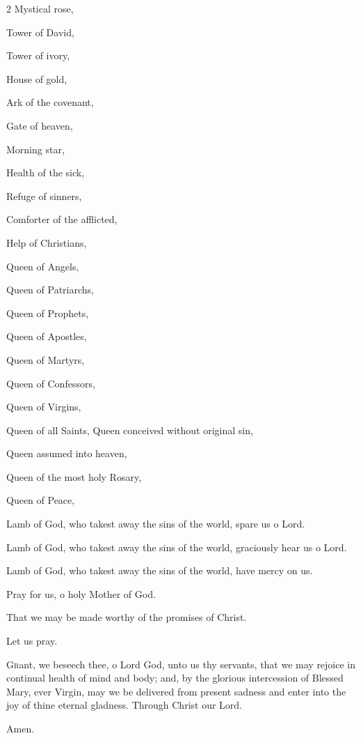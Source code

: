\begin{enpars}
\begin{multicols}{2}
Mystical rose,

Tower of David,

Tower of ivory,

House of gold,

Ark of the covenant,

Gate of heaven,

Morning star,

Health of the sick,

Refuge of sinners,

Comforter of the afflicted,

Help of Christians,

Queen of Angels,

Queen of Patriarchs,

Queen of Prophets,

Queen of Apostles,

Queen of Martyrs,

Queen of Confessors,

Queen of Virgins,

Queen of all Saints,
Queen conceived without original sin,

Queen assumed into heaven,

Queen of the most holy Rosary,

Queen of Peace,

Lamb of God, who takest away
the sins of the world, 
spare us o Lord.

Lamb of God, who takest away
the sins of the world, 
graciously hear us o Lord.

Lamb of God, who takest away
the sins of the world, have mercy on us.
\end{multicols}

\vv Pray for us, o holy Mother of God. 

\rr That we may be made worthy of the promises of Christ.

Let us pray. \nopagebreak

\lettrine{G}{r}ant, we beseech thee, o Lord God, unto us thy servants, that we may rejoice in continual health of mind and body; and, by the glorious intercession of Blessed Mary, ever Virgin, may we be delivered from present sadness and enter into the joy of thine eternal gladness. Through Christ our Lord.

\rr Amen.

\end{enpars}